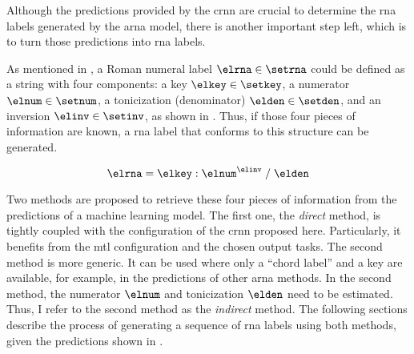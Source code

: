 
Although the predictions provided by the \gls{crnn} are
crucial to determine the \gls{rna} labels generated by the
\gls{arna} model, there is another important step left,
which is to turn those predictions into \gls{rna} labels.

As mentioned in
, a Roman
numeral label $\elrna \in \setrna$ could be defined as a
string with four components: a key $\elkey \in \setkey$, a
numerator $\elnum \in \setnum$, a tonicization (denominator)
$\elden \in \setden$, and an inversion $\elinv \in \setinv$,
as shown in . Thus, if those four pieces of
information are known, a \gls{rna} label that conforms to
this structure can be generated.

\begin{equation}
    \label{eq:rna}
    \elrna = \elkey : \elnum^{\elinv} \; / \; \elden
\end{equation}

Two methods are proposed to retrieve these four pieces of
information from the predictions of a machine learning
model. The first one, the \emph{direct} method, is tightly
coupled with the configuration of the \gls{crnn} proposed
here. Particularly, it benefits from the \gls{mtl}
configuration and the chosen output tasks. The second method
is more generic. It can be used where only a ``chord label''
and a key are available, for example, in the predictions of
other \gls{arna} methods. In the second method, the
numerator $\elnum$ and tonicization $\elden$ need to be
estimated. Thus, I refer to the second method as the
\emph{indirect} method. The following sections describe the
process of generating a sequence of \gls{rna} labels using both
methods, given the predictions shown in
.




